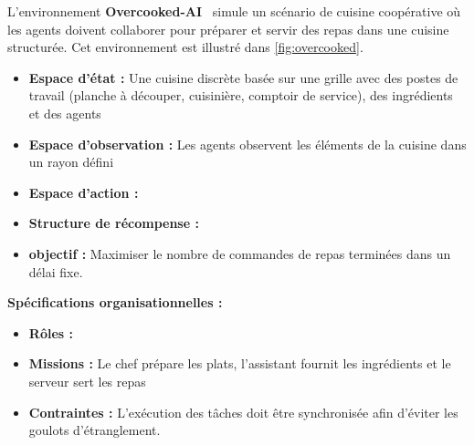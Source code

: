 L'environnement \textbf{Overcooked-AI}~\cite{Carroll2019} simule un scénario de cuisine coopérative où les agents doivent collaborer pour préparer et servir des repas dans une cuisine structurée. Cet environnement est illustré dans \autoref{fig:overcooked}.

\begin{itemize}
  \item \textbf{Espace d'état :} Une cuisine discrète basée sur une grille avec des postes de travail (planche à découper, cuisinière, comptoir de service), des ingrédients et des agents
  \item \textbf{Espace d'observation :} Les agents observent les éléments de la cuisine dans un rayon défini
  \item \textbf{Espace d'action :}
  \item \textbf{Structure de récompense :}
  \item \textbf{objectif :} Maximiser le nombre de commandes de repas terminées dans un délai fixe.
\end{itemize}
%
\textbf{Spécifications organisationnelles :}
\begin{itemize}
  \item \textbf{Rôles :} 
  \item \textbf{Missions :} Le chef prépare les plats, l'assistant fournit les ingrédients et le serveur sert les repas
  \item \textbf{Contraintes :} L'exécution des tâches doit être synchronisée afin d'éviter les goulots d'étranglement.
\end{itemize}

